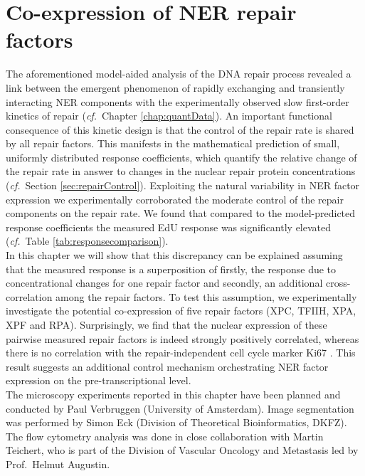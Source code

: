 \chapter{Co-expression of NER repair factors}
\label{chap:crossCorell}
The aforementioned model-aided analysis of the DNA repair process revealed a link between the emergent phenomenon of rapidly exchanging and transiently interacting NER components with the experimentally observed slow first-order kinetics of repair (\textit{cf.}\ Chapter \ref{chap:quantData}). An important functional consequence of this kinetic design is that the control of the repair rate is shared by all repair factors. This manifests in the mathematical prediction of small, uniformly distributed response coefficients, which quantify the relative change of the repair rate in answer to changes in the nuclear repair protein concentrations (\textit{cf.}\ Section \ref{sec:repairControl}). Exploiting the natural variability in NER factor expression we experimentally corroborated the moderate control of the repair components on the repair rate. We found that compared to the model-predicted response coefficients the measured EdU response was significantly elevated (\textit{cf.}\ Table \ref{tab:responsecomparison}). \\ 
In this chapter we will show that this discrepancy can be explained assuming that the measured response is a superposition of firstly, the response due to concentrational changes for one repair factor and secondly, an additional cross-correlation among the repair factors. To test this assumption, we experimentally investigate the potential co-expression of five repair factors (XPC, TFIIH, XPA, XPF and RPA). Surprisingly, we find that the nuclear expression of these pairwise measured repair factors is indeed strongly positively correlated, whereas there is no correlation with the repair-independent cell cycle marker Ki67 \cite{Scholzen2000}. This result suggests an additional control mechanism orchestrating NER factor expression on the pre-transcriptional level.\\ 

The microscopy experiments reported in this chapter have been planned and conducted by Paul Verbruggen (University of Amsterdam). Image segmentation was performed by Simon Eck (Division of Theoretical Bioinformatics, DKFZ). The flow cytometry analysis was done in close collaboration with Martin Teichert, who is part of the Division of Vascular Oncology and Metastasis led by Prof.\ Helmut Augustin. 
 



